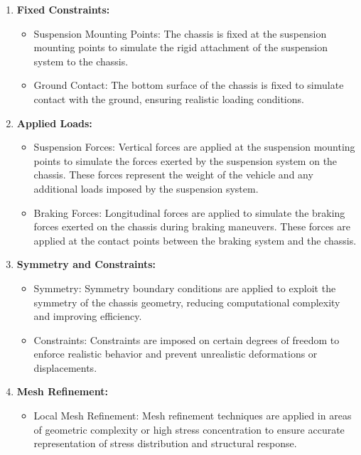 \begin{enumerate}
  \item \textbf{Fixed Constraints:}
  \begin{itemize}
    \item Suspension Mounting Points: The chassis is fixed at the suspension mounting points to simulate the rigid attachment of the suspension system to the chassis.
    \item Ground Contact: The bottom surface of the chassis is fixed to simulate contact with the ground, ensuring realistic loading conditions.
  \end{itemize}

  \item \textbf{Applied Loads:}
  \begin{itemize}
    \item Suspension Forces: Vertical forces are applied at the suspension mounting points to simulate the forces exerted by the suspension system on the chassis. These forces represent the weight of the vehicle and any additional loads imposed by the suspension system.
    \item Braking Forces: Longitudinal forces are applied to simulate the braking forces exerted on the chassis during braking maneuvers. These forces are applied at the contact points between the braking system and the chassis.
  \end{itemize}

  \item \textbf{Symmetry and Constraints:}
  \begin{itemize}
    \item Symmetry: Symmetry boundary conditions are applied to exploit the symmetry of the chassis geometry, reducing computational complexity and improving efficiency.
    \item Constraints: Constraints are imposed on certain degrees of freedom to enforce realistic behavior and prevent unrealistic deformations or displacements.
  \end{itemize}

  \item \textbf{Mesh Refinement:}
  \begin{itemize}
    \item Local Mesh Refinement: Mesh refinement techniques are applied in areas of geometric complexity or high stress concentration to ensure accurate representation of stress distribution and structural response.
  \end{itemize}
\end{enumerate}


